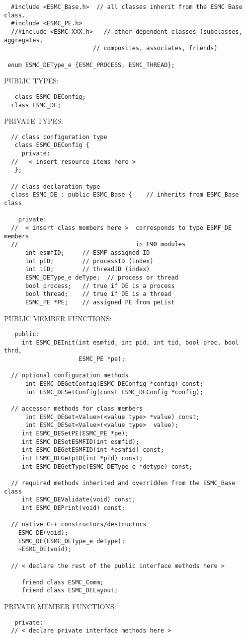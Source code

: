\begin{verbatim}  #include <ESMC_Base.h>  // all classes inherit from the ESMC Base class.
  #include <ESMC_PE.h> 
  //#include <ESMC_XXX.h>   // other dependent classes (subclasses, aggregates,
                         // composites, associates, friends)
 
 enum ESMC_DEType_e {ESMC_PROCESS, ESMC_THREAD};
 \end{verbatim}{\sf PUBLIC TYPES:}
\begin{verbatim}   class ESMC_DEConfig;
  class ESMC_DE;
 \end{verbatim}{\sf PRIVATE TYPES:}
\begin{verbatim} 
  // class configuration type
   class ESMC_DEConfig {
     private:
  //   < insert resource items here >
   };
 
  // class declaration type
  class ESMC_DE : public ESMC_Base {    // inherits from ESMC_Base class
 
    private:
  //  < insert class members here >  corresponds to type ESMF_DE members
  //                                 in F90 modules
      int esmfID;     // ESMF assigned ID
      int pID;        // processID (index)
      int tID;        // threadID (index)
      ESMC_DEType_e deType;  // process or thread
      bool process;   // true if DE is a process
      bool thread;    // true if DE is a thread
      ESMC_PE *PE;    // assigned PE from peList
 \end{verbatim}{\sf PUBLIC MEMBER FUNCTIONS:}
\begin{verbatim}   public:
     int ESMC_DEInit(int esmfid, int pid, int tid, bool proc, bool thrd,
                     ESMC_PE *pe);
 
  // optional configuration methods
      int ESMC_DEGetConfig(ESMC_DEConfig *config) const;
      int ESMC_DESetConfig(const ESMC_DEConfig *config);
 
  // accessor methods for class members
      int ESMC_DEGet<Value>(<value type> *value) const;
      int ESMC_DESet<Value>(<value type>  value);
     int ESMC_DESetPE(ESMC_PE *pe);
     int ESMC_DESetESMFID(int esmfid);
     int ESMC_DEGetESMFID(int *esmfid) const;
     int ESMC_DEGetpID(int *pid) const;
     int ESMC_DEGetType(ESMC_DEType_e *detype) const;
     
  // required methods inherited and overridden from the ESMC_Base class
     int ESMC_DEValidate(void) const;
     int ESMC_DEPrint(void) const;
 
  // native C++ constructors/destructors
 	ESMC_DE(void);
 	ESMC_DE(ESMC_DEType_e detype);
 	~ESMC_DE(void);
   
  // < declare the rest of the public interface methods here >
 
     friend class ESMC_Comm;
     friend class ESMC_DELayout;
   \end{verbatim}{\sf PRIVATE MEMBER FUNCTIONS:}
\begin{verbatim}   private: 
  // < declare private interface methods here >\end{verbatim}

